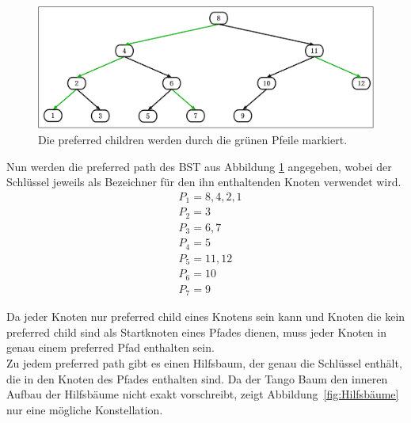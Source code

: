 \documentclass[a4paper,12pt]{article}
\begin{document}
\begin{figure}[H]
	\centering
	\includegraphics[width=1\textwidth]{"Medien/Tango/prefChilds"}
	\caption{Die preferred children werden durch die grünen Pfeile markiert. }
	\label{fig:prefChilds}
\end{figure}

\noindent Nun werden die preferred path des BST aus Abbildung \ref{fig:prefChilds} angegeben, wobei der Schlüssel jeweils als Bezeichner für den ihn enthaltenden Knoten verwendet wird.
\begin{align*}
&P_1 = 8, 4, 2,1 \\
&P_2 = 3 \\
&P_3 = 6, 7 \\
&P_4 = 5 \\
&P_5 = 11, 12 \\
&P_6 = 10 \\
&P_7 = 9
\end{align*}

\noindent Da jeder Knoten nur preferred child eines Knotens sein kann und Knoten die kein preferred child sind als Startknoten eines Pfades dienen, muss jeder Knoten in genau einem preferred Pfad enthalten sein.\\
Zu jedem preferred path gibt es einen Hilfsbaum, der genau die Schlüssel enthält, die in den Knoten des Pfades enthalten sind. Da der Tango Baum den inneren Aufbau der Hilfsbäume nicht exakt vorschreibt, zeigt \mbox{Abbildung \ref{fig:Hilfsbäume}} nur eine mögliche Konstellation.
\end{document}
